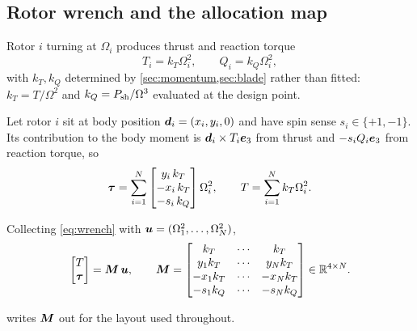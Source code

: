 \subsection{Rotor wrench and the allocation map}

\begin{model}
\label{mod:rotorcoeff}
Rotor $i$ turning at $\Omega_i$ produces thrust and reaction torque
\begin{equation}
  T_i = k_T\Omega_i^2, \qquad Q_i = k_Q\Omega_i^2 ,
  \label{eq:ktkq}
\end{equation}
with $k_T,k_Q$ determined by \cref{sec:momentum,sec:blade} rather than fitted:
$k_T = T/\Omega^2$ and $k_Q = P_{\mathrm{sh}}/\Omega^3$ evaluated at the design point.
\end{model}

Let rotor $i$ sit at body position $\bm{d}_i = (x_i,y_i,0)$ and have spin
sense $s_i\in\{+1,-1\}$. Its contribution to the body moment is
$\bm{d}_i\times T_i\bm{e}_3$ from thrust and $-s_iQ_i\bm{e}_3$ from reaction torque, so
\begin{equation}
  \bm{\tau} = \sum_{i=1}^{N}
    \begin{bmatrix} y_i\,k_T \\ -x_i\,k_T \\ -s_i\,k_Q \end{bmatrix}\Omega_i^2 ,
  \qquad
  T = \sum_{i=1}^{N} k_T\Omega_i^2 .
  \label{eq:wrench}
\end{equation}

\begin{definition}
Collecting \cref{eq:wrench} with $\bm{u} = (\Omega_1^2,\dots,\Omega_N^2)$,
\begin{equation}
  \begin{bmatrix} T \\ \bm{\tau} \end{bmatrix}
  = \bm{M}\,\bm{u},
  \qquad
  \bm{M} =
  \begin{bmatrix}
    k_T & \cdots & k_T\\
    y_1 k_T & \cdots & y_N k_T\\
    -x_1 k_T & \cdots & -x_N k_T\\
    -s_1 k_Q & \cdots & -s_N k_Q
  \end{bmatrix} \in \mathbb{R}^{4\times N} .
  \label{eq:alloc}
\end{equation}
\end{definition}

 writes $\bm{M}$ out for the layout used throughout.


